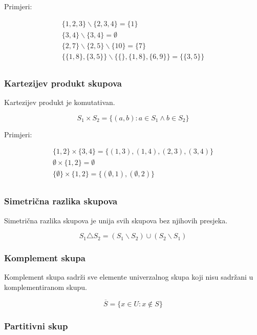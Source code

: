 Primjeri:

\begin{gather*}
    \{1, 2, 3\} \backslash \{2, 3, 4\} = \{1\} \\
    \{3, 4\} \backslash \{3, 4\} = \emptyset \\
    \{2, 7\} \backslash \{2, 5\} \backslash \{10\} = \{7\} \\
    \{\{1, 8\}, \{3, 5\}\} \backslash \{\{\}, \{1, 8\}, \{6, 9\}\} = \{\{3, 5\}\} \\
\end{gather*}

\subsubsection{Kartezijev produkt skupova}

Kartezijev produkt je komutativan.

$$
S_1 \times S_2 = \{(a, b): a \in S_1 \wedge b \in S_2\}
$$

Primjeri:

\begin{gather*}
    \{1, 2\} \times \{3, 4\} = \{(1, 3), (1, 4), (2, 3), (3, 4)\} \\
    \emptyset \times \{1, 2\} = \emptyset \\
    \{\emptyset\} \times \{1, 2\} = \{(\emptyset, 1), (\emptyset, 2)\} \\
\end{gather*}

\subsubsection{Simetrična razlika skupova}

Simetrična razlika skupova je unija svih skupova bez njihovih presjeka.

$$
S_1 \triangle S_2 = (S_1 \backslash S_2) \cup (S_2 \backslash S_1)
$$

\subsubsection{Komplement skupa}

Komplement skupa sadrži sve elemente univerzalnog skupa koji nisu sadržani u komplementiranom skupu.

$$
\overline{S} = \{x \in U: x \notin S\}
$$

\subsubsection{Partitivni skup}

